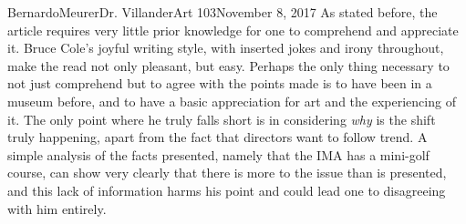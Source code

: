 \documentclass[12pt,letterpaper]{article}
\begin{document}
\begin{mla}{Bernardo}{Meurer}{Dr. Villander}{Art 103}{November 8, 2017}
        As stated before, the article requires very little prior knowledge for one to comprehend and appreciate it. Bruce Cole's joyful writing style, with inserted jokes and irony throughout, make the read not only pleasant, but easy. Perhaps the only thing necessary to not just comprehend but to agree with the points made is to have been in a museum before, and to have a basic appreciation for art and the experiencing of it. The only point where he truly falls short is in considering \emph{why} is the shift truly happening, apart from the fact that directors want to follow trend. A simple analysis of the facts presented, namely that the IMA has a mini-golf course, can show very clearly that there is more to the issue than is presented, and this lack of information harms his point and could lead one to disagreeing with him entirely. 

    \end{mla}
    
\end{document}
